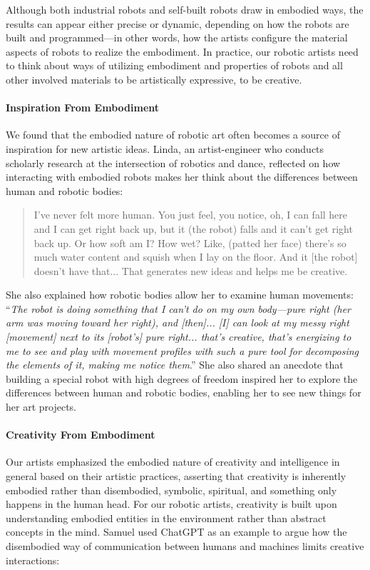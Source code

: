 Although both industrial robots and self-built robots draw in embodied ways, the results can appear either precise or dynamic, depending on how the robots are built and programmed---in other words, how the artists configure the material aspects of robots to realize the embodiment. In practice, our robotic artists need to think about ways of utilizing embodiment and properties of robots and all other involved materials to be artistically expressive, to be creative.

\paragraph{Inspiration From Embodiment}
We found that the embodied nature of robotic art often becomes a source of inspiration for new artistic ideas. Linda, an artist-engineer who conducts scholarly research at the intersection of robotics and dance, reflected on how interacting with embodied robots makes her think about the differences between human and robotic bodies:

\begin{quote}
    I've never felt more human. You just feel, you notice, oh, I can fall here and I can get right back up, but it (the robot) falls and it can't get right back up. Or how soft am I? How wet? Like, (patted her face) there's so much water content and squish when I lay on the floor. And it [the robot] doesn't have that... That generates new ideas and helps me be creative.
\end{quote}

She also explained how robotic bodies allow her to examine human movements: ``\textit{The robot is doing something that I can't do on my own body---pure right (her arm was moving toward her right), and [then]... [I] can look at my messy right [movement] next to its [robot's] pure right... that's creative, that's energizing to me to see and play with movement profiles with such a pure tool for decomposing the elements of it, making me notice them}.'' She also shared an anecdote that building a special robot with high degrees of freedom inspired her to explore the differences between human and robotic bodies, enabling her to see new things for her art projects.

\paragraph{Creativity From Embodiment}
Our artists emphasized the embodied nature of creativity and intelligence in general based on their artistic practices, asserting that creativity is inherently embodied rather than disembodied, symbolic, spiritual, and something only happens in the human head. For our robotic artists, creativity is built upon understanding embodied entities in the environment rather than abstract concepts in the mind. Samuel used ChatGPT as an example to argue how the disembodied way of communication between humans and machines limits creative interactions:

